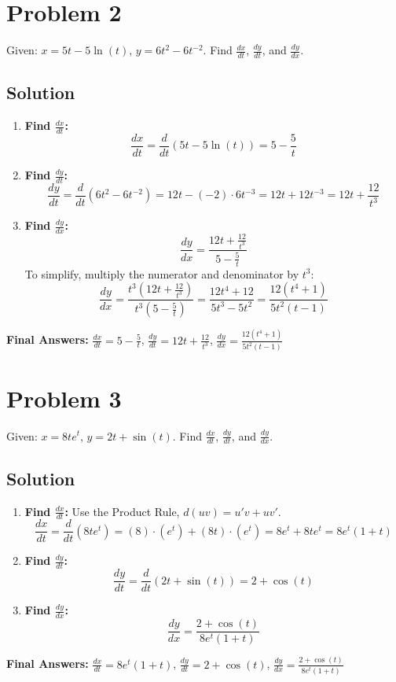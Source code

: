 \documentclass{article}
\begin{document}
\section{Problem 2}
Given: $x = 5t - 5\ln(t)$, $y = 6t^2 - 6t^{-2}$. Find $\frac{dx}{dt}$, $\frac{dy}{dt}$, and $\frac{dy}{dx}$.

\subsection*{Solution}
\begin{enumerate}
    \item \textbf{Find $\frac{dx}{dt}$:}
    \[ \frac{dx}{dt} = \frac{d}{dt}(5t - 5\ln(t)) = 5 - \frac{5}{t} \]
    \item \textbf{Find $\frac{dy}{dt}$:}
    \[ \frac{dy}{dt} = \frac{d}{dt}(6t^2 - 6t^{-2}) = 12t - (-2) \cdot 6t^{-3} = 12t + 12t^{-3} = 12t + \frac{12}{t^3} \]
    \item \textbf{Find $\frac{dy}{dx}$:}
    \[ \frac{dy}{dx} = \frac{12t + \frac{12}{t^3}}{5 - \frac{5}{t}} \]
    To simplify, multiply the numerator and denominator by $t^3$:
    \[ \frac{dy}{dx} = \frac{t^3(12t + \frac{12}{t^3})}{t^3(5 - \frac{5}{t})} = \frac{12t^4 + 12}{5t^3 - 5t^2} = \frac{12(t^4 + 1)}{5t^2(t-1)} \]
\end{enumerate}
\textbf{Final Answers:}
$\frac{dx}{dt} = 5 - \frac{5}{t}$,
$\frac{dy}{dt} = 12t + \frac{12}{t^3}$,
$\frac{dy}{dx} = \frac{12(t^4 + 1)}{5t^2(t-1)}$

\section{Problem 3}
Given: $x = 8te^t$, $y = 2t + \sin(t)$. Find $\frac{dx}{dt}$, $\frac{dy}{dt}$, and $\frac{dy}{dx}$.

\subsection*{Solution}
\begin{enumerate}
    \item \textbf{Find $\frac{dx}{dt}$:} Use the Product Rule, $d(uv) = u'v + uv'$.
    \[ \frac{dx}{dt} = \frac{d}{dt}(8te^t) = (8) \cdot (e^t) + (8t) \cdot (e^t) = 8e^t + 8te^t = 8e^t(1+t) \]
    \item \textbf{Find $\frac{dy}{dt}$:}
    \[ \frac{dy}{dt} = \frac{d}{dt}(2t + \sin(t)) = 2 + \cos(t) \]
    \item \textbf{Find $\frac{dy}{dx}$:}
    \[ \frac{dy}{dx} = \frac{2 + \cos(t)}{8e^t(1+t)} \]
\end{enumerate}
\textbf{Final Answers:}
$\frac{dx}{dt} = 8e^t(1+t)$,
$\frac{dy}{dt} = 2 + \cos(t)$,
$\frac{dy}{dx} = \frac{2 + \cos(t)}{8e^t(1+t)}$
\end{document}
